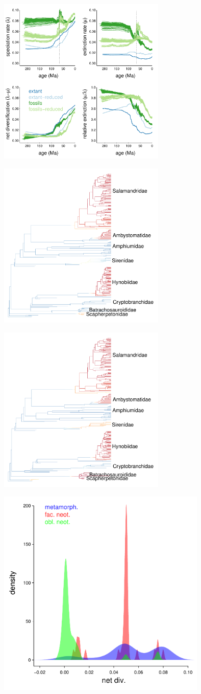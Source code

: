 \documentclass{article}
\begin{document}
\includegraphics[width=8cm, height=8cm]{spex.pdf}

\includegraphics[width=8cm, height=8cm]{fossil_sp.pdf}

\includegraphics[width=8cm, height=8cm]{fossil_sp_alt.pdf}

\includegraphics[width=10cm, height=10cm]{dev_rates.pdf}
\end{document}
